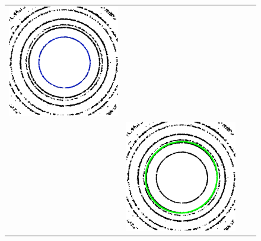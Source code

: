 \documentclass[preprint]{iucr}              %
\begin{document}
\begin{figure}
\begin{tabular}{>{\centering\arraybackslash}m{.1\linewidth}>{\centering\arraybackslash}m{.25\linewidth}>{\centering\arraybackslash}m{.25\linewidth}>{\centering\arraybackslash}m{.25\linewidth}}
\includegraphics[width=\linewidth]{Detail/o_max1_RF_2_5.png}
\\
{\color{green}Ellipse}&
\includegraphics[width=\linewidth]{Detail/o_max1_EF_1_6.png}&

\end{tabular}
\end{figure}
\end{document}
